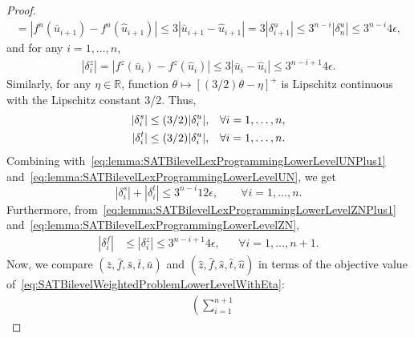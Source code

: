 \documentclass[runningheads,orivec]{llncs}
\newcommand{\MacroColor}[1]{#1}
\newcommand{\NVariables}{\MacroColor{n}}
\newcommand{\ReformZ}{\MacroColor{z}}
\newcommand{\ReformAugFrac}{\MacroColor{f}}
\newcommand{\LexUVar}{\MacroColor{\theta}}
\newcommand{\LexLVarS}{\MacroColor{s}}
\newcommand{\LexLVarT}{\MacroColor{t}}
\newcommand{\LexLVarU}{\MacroColor{u}}
\newcommand{\LexLVarFuncU}{\MacroColor{f^u}}
\newcommand{\LexLVarFuncZ}{\MacroColor{f^z}}
\begin{document}
\begin{appendix}
\begin{proof}
\begin{align}
=
|\LexLVarFuncU(\bar{\LexLVarU}_{i + 1}) - \LexLVarFuncU(\hat{\LexLVarU}_{i + 1})|
\le
3|\bar{\LexLVarU}_{i + 1} - \hat{\LexLVarU}_{i + 1}|
=
3 |\delta^{\LexLVarU}_{i + 1}|
\le
3^{\NVariables - i} |\delta^{\LexLVarU}_{\NVariables}|
\le
3^{\NVariables - i} 4 \epsilon,
\label{eq:lemma:SATBilevelLexProgrammingLowerLevelUN}
\end{align}
and for any $i = 1, \ldots, \NVariables$,
\begin{align}
|\delta^{\ReformZ}_{i}|
=
|\LexLVarFuncZ(\bar{\LexLVarU}_{i}) - \LexLVarFuncZ(\hat{\LexLVarU}_{i})|
\le
3|\bar{\LexLVarU}_{i} - \hat{\LexLVarU}_{i}|
\le
3^{\NVariables - i + 1} 4 \epsilon.
\label{eq:lemma:SATBilevelLexProgrammingLowerLevelZN}
\end{align}
Similarly, for any $\eta \in \mathbb{R}$, function $\LexUVar \mapsto [(3/2) \LexUVar - \eta]^+$ is Lipschitz continuous with the Lipschitz constant 3/2.
Thus,
\begin{align}
|\delta^{\LexLVarS}_{i}|
&\le
(3/2) |\delta^{\LexLVarU}_{i}|,
&& \forall i = 1, \ldots, \NVariables,
\label{eq:lemma:SATBilevelLexProgrammingLowerLevelSN}
\\
|\delta^{\LexLVarT}_{i}|
&\le
(3/2) |\delta^{\LexLVarU}_{i}|,
&& \forall i = 1, \ldots, \NVariables.
\notag
\end{align}
Combining with~\eqref{eq:lemma:SATBilevelLexProgrammingLowerLevelUNPlus1} and~\eqref{eq:lemma:SATBilevelLexProgrammingLowerLevelUN}, we get
\begin{equation}
|\delta^{\LexLVarS}_{i}|
+
|\delta^{\LexLVarT}_{i}|
\le
3^{\NVariables - i} 12 \epsilon,
\qquad
\forall i = 1, \ldots, \NVariables.
\label{eq:lemma:SATBilevelLexProgrammingLowerLevelSNPlusTN}
\end{equation}
Furthermore, from~\eqref{eq:lemma:SATBilevelLexProgrammingLowerLevelZNPlus1} and~\eqref{eq:lemma:SATBilevelLexProgrammingLowerLevelZN},
\begin{align}
|\delta^{\ReformAugFrac}_{i}|
&\le
|\delta^{\ReformZ}_{i}|
\le
3^{\NVariables - i + 1} 4 \epsilon,
&& \forall i = 1, \ldots, \NVariables + 1.
\label{eq:lemma:SATBilevelLexProgrammingLowerLevelFN}
\end{align}
Now, we compare
$(\bar{\ReformZ}, \bar{\ReformAugFrac}, \bar{\LexLVarS}, \bar{\LexLVarT}, \bar{\LexLVarU})$ and $(\hat{\ReformZ}, \hat{\ReformAugFrac}, \hat{\LexLVarS}, \hat{\LexLVarT}, \hat{\LexLVarU})$ in terms of the objective value of~\eqref{eq:SATBilevelWeightedProblemLowerLevelWithEta}:
\begin{align*}
&
\left(
\sum_{i = 1}^{\NVariables + 1}

\end{align*}
\end{proof}
\end{appendix}
\end{document}
